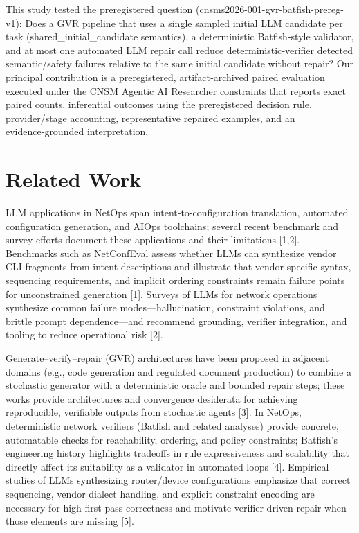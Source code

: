 \documentclass[conference]{IEEEtran}
\begin{document}
This study tested the preregistered question (cnsms2026-001-gvr-batfish-prereg-v1): Does a GVR pipeline that uses a single sampled initial LLM candidate per task (shared\_initial\_candidate semantics), a deterministic Batfish‑style validator, and at most one automated LLM repair call reduce deterministic‑verifier detected semantic/safety failures relative to the same initial candidate without repair? Our principal contribution is a preregistered, artifact‑archived paired evaluation executed under the CNSM Agentic AI Researcher constraints that reports exact paired counts, inferential outcomes using the preregistered decision rule, provider/stage accounting, representative repaired examples, and an evidence‑grounded interpretation.

\section{Related Work}
LLM applications in NetOps span intent‑to‑configuration translation, automated configuration generation, and AIOps toolchains; several recent benchmark and survey efforts document these applications and their limitations [1,2]. Benchmarks such as NetConfEval assess whether LLMs can synthesize vendor CLI fragments from intent descriptions and illustrate that vendor‑specific syntax, sequencing requirements, and implicit ordering constraints remain failure points for unconstrained generation [1]. Surveys of LLMs for network operations synthesize common failure modes---hallucination, constraint violations, and brittle prompt dependence---and recommend grounding, verifier integration, and tooling to reduce operational risk [2].

Generate--verify--repair (GVR) architectures have been proposed in adjacent domains (e.g., code generation and regulated document production) to combine a stochastic generator with a deterministic oracle and bounded repair steps; these works provide architectures and convergence desiderata for achieving reproducible, verifiable outputs from stochastic agents [3]. In NetOps, deterministic network verifiers (Batfish and related analyses) provide concrete, automatable checks for reachability, ordering, and policy constraints; Batfish's engineering history highlights tradeoffs in rule expressiveness and scalability that directly affect its suitability as a validator in automated loops [4]. Empirical studies of LLMs synthesizing router/device configurations emphasize that correct sequencing, vendor dialect handling, and explicit constraint encoding are necessary for high first‑pass correctness and motivate verifier‑driven repair when those elements are missing [5].
\end{document}
